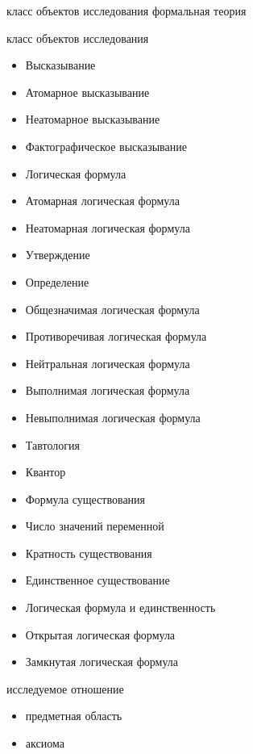 \begin{SCn}
\scnsectionheader{\currentname}
\begin{scnsubstruct}
\begin{scnhaselementrole}{класс объектов исследования}
формальная теория\end{scnhaselementrole}
\begin{scnhaselementrolelist}{класс объектов исследования}
\begin{itemize}
\item Высказывание
\item Атомарное высказывание
\item Неатомарное высказывание
\item Фактографическое высказывание
\item Логическая формула
\item Атомарная логическая формула
\item Неатомарная логическая формула
\item Утверждение
\item Определение
\item Общезначимая логическая формула
\item Противоречивая логическая формула
\item Нейтральная логическая формула
\item Выполнимая логическая формула
\item Невыполнимая логическая формула
\item Тавтология
\item Квантор
\item Формула существования
\item Число значений переменной
\item Кратность существования
\item Единственное существование
\item Логическая формула и единственность
\item Открытая логическая формула
\item Замкнутая логическая формула
\end{itemize}
\end{scnhaselementrolelist}
\begin{scnhaselementrolelist}{исследуемое отношение}
\begin{itemize}
\item предметная область\scnrolesign
\item аксиома\scnrolesign

\end{itemize}
\end{scnhaselementrolelist}
\end{scnsubstruct}
\end{SCn}
